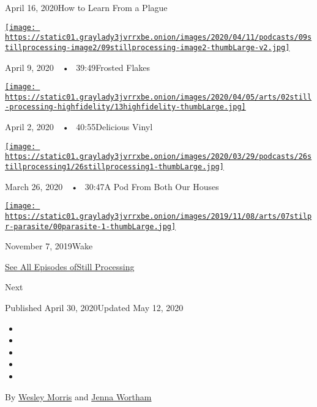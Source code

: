 April 16, 2020How to Learn From a Plague

\href{https://www.nytimes3xbfgragh.onion/2020/04/09/podcasts/still-processing-tiger-king.html?action=click\&module=audio-series-bar\&region=header\&pgtype=Article}{\texttt{[image: https://static01.graylady3jvrrxbe.onion/images/2020/04/11/podcasts/09stillprocessing-image2/09stillprocessing-image2-thumbLarge-v2.jpg]}}

April 9, 2020~~•~ 39:49Frosted Flakes

\href{https://www.nytimes3xbfgragh.onion/2020/04/02/podcasts/high-fidelity-zoe-kravitz.html?action=click\&module=audio-series-bar\&region=header\&pgtype=Article}{\texttt{[image: https://static01.graylady3jvrrxbe.onion/images/2020/04/05/arts/02still-processing-highfidelity/13highfidelity-thumbLarge.jpg]}}

April 2, 2020~~•~ 40:55Delicious Vinyl

\href{https://www.nytimes3xbfgragh.onion/2020/03/26/podcasts/still-processing-quarantine.html?action=click\&module=audio-series-bar\&region=header\&pgtype=Article}{\texttt{[image: https://static01.graylady3jvrrxbe.onion/images/2020/03/29/podcasts/26stillprocessing1/26stillprocessing1-thumbLarge.jpg]}}

March 26, 2020~~•~ 30:47A Pod From Both Our Houses

\href{https://www.nytimes3xbfgragh.onion/2019/11/07/podcasts/still-processing-parasite-watchmen-bong-joon-ho.html?action=click\&module=audio-series-bar\&region=header\&pgtype=Article}{\texttt{[image: https://static01.graylady3jvrrxbe.onion/images/2019/11/08/arts/07stilpr-parasite/00parasite-1-thumbLarge.jpg]}}

November 7, 2019Wake

\href{https://www.nytimes3xbfgragh.onion/column/still-processing-podcast}{See
All Episodes ofStill Processing}

Next

Published April 30, 2020Updated May 12, 2020

\begin{itemize}
\item
\item
\item
\item
\item
\end{itemize}

By \href{https://www.nytimes3xbfgragh.onion/by/wesley-morris}{Wesley
Morris} and
\href{https://www.nytimes3xbfgragh.onion/by/jenna-wortham}{Jenna
Wortham}

